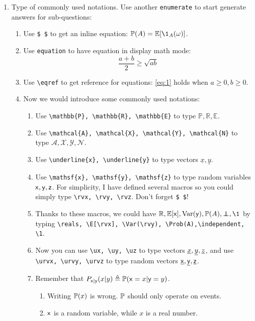 \documentclass[a4paper]{article}
\begin{document}
\begin{enumerate}
  \setlength{\itemsep}{3\parskip}

  \item Type of commonly used notations. Use another \texttt{enumerate} to start generate answers for sub-questions:
    \begin{enumerate}
    \item Use \verb|$ $| to get an inline equation: $\Prob(A) = \E[\1_A(\omega)]$.
    \item Use \texttt{equation} to have equation in display math mode:
      \begin{equation}
        \frac{a + b}{2} \geq \sqrt{ab}
        \label{eq:1}
      \end{equation}
      
    \item Use \verb|\eqref| to get reference for equations: \eqref{eq:1} holds when $a\geq 0, b\geq 0$.
      
    \item Now we would introduce some commonly used notations:
      \begin{enumerate}
      \item Use \verb|\mathbb{P}, \mathbb{R}, \mathbb{E}| to type $\mathbb{P}, \mathbb{R}, \mathbb{E}$.
      \item Use \verb|\mathcal{A}, \mathcal{X}, \mathcal{Y}, \mathcal{N}| to type $\mathcal{A}, \mathcal{X}, \mathcal{Y}, \mathcal{N}$.
      \item Use \verb|\underline{x}, \underline{y}| to type vectors $\underline{x}, \underline{y}$.
      \item Use \verb|\mathsf{x}, \mathsf{y}, \mathsf{z}| to type random variables $\mathsf{x}, \mathsf{y}, \mathsf{z}$. For simplicity, I have defined several macros so you could simply type \verb|\rvx, \rvy, \rvz|. Don't forget \verb|$ $|!
      \item Thanks to these macros, we could have $\reals, \E[\rvx], \Var(\rvy), \Prob(A), \independent, \1$ by typing \verb|\reals, \E[\rvx], \Var(\rvy), \Prob(A),\independent,| \verb|\1|.
      \item Now you can use \verb|\ux, \uy, \uz| to type vectors $\underline{x}, \underline{y}, \underline{z}$, and use \verb|\urvx, \urvy, \urvz| to type random vectors $\underline{\mathsf{x}}, \underline{\mathsf{y}}, \underline{\mathsf{z}}$.   
      \item Remember that $P_{\mathsf{x}|\mathsf{y}}(x|y) \triangleq \operatorname{\mathbb{P}}(\mathsf{x} = x|\mathsf{y} = y)$.
        \begin{enumerate}
        \item Writing $\operatorname{\mathbb{P}}(x)$ is wrong. $\operatorname{\mathbb{P}}$ should only operate on events.
        \item $\mathsf{x}$ is a random variable, while $x$ is a real number.
        \end{enumerate}
        

\end{enumerate}
\end{enumerate}
\end{enumerate}
\end{document}
